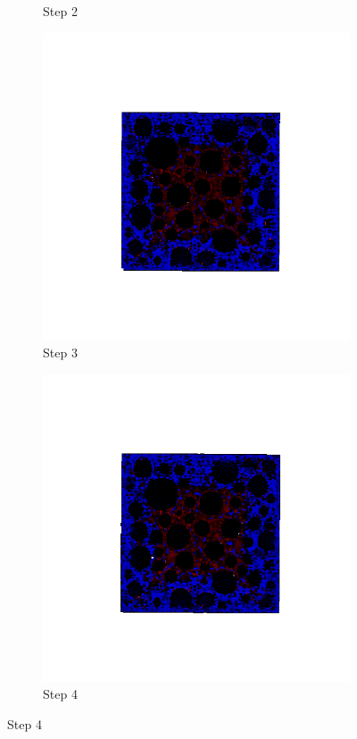 \begin{figure}[ht!]
\begin{subfigure}{.25\textwidth}
      \caption{Step 2}
      \end{subfigure}%
      \begin{subfigure}{.25\textwidth}
        \centering
        \includegraphics[width=1.0\linewidth]{Files/A30X0C_3_IS/DEP50-STEP(003).png}
      \caption{Step 3}
      \end{subfigure}%
      \begin{subfigure}{.25\textwidth}
        \centering
        \includegraphics[width=1.0\linewidth]{Files/A30X0C_3_IS/DEP50-STEP(004).png}
      \caption{Step 4}
      \end{subfigure}


\end{figure}

